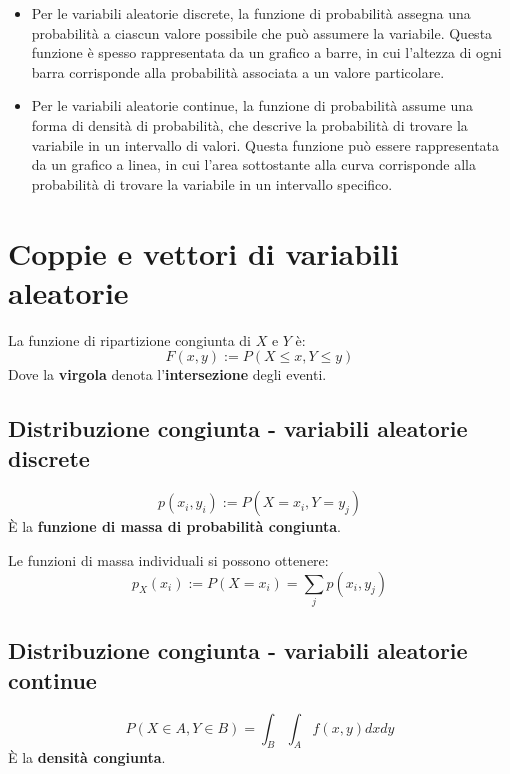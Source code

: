 \begin{itemize}
  \item Per le variabili aleatorie discrete, la funzione di probabilità assegna una probabilità a ciascun valore possibile che può assumere la variabile. Questa funzione è spesso rappresentata da un grafico a barre, in cui l'altezza di ogni barra corrisponde alla probabilità associata a un valore particolare.

  \item Per le variabili aleatorie continue, la funzione di probabilità assume una forma di densità di probabilità, che descrive la probabilità di trovare la variabile in un intervallo di valori. Questa funzione può essere rappresentata da un grafico a linea, in cui l'area sottostante alla curva corrisponde alla probabilità di trovare la variabile in un intervallo specifico.
\end{itemize}

\section{Coppie e vettori di variabili aleatorie}

La funzione di ripartizione congiunta di $X$ e $Y$ è:
\begin{equation}
  F(x, y) := P(X \leq x, Y \leq y)
\end{equation}
Dove la \textbf{virgola} denota l'\textbf{intersezione} degli eventi.

\subsection{Distribuzione congiunta - variabili aleatorie discrete}
\begin{equation}
  p(x_i, y_i) := P(X = x_i, Y = y_j)
\end{equation}
È la \textbf{funzione di massa di probabilità congiunta}.

Le funzioni di massa individuali si possono ottenere:
\begin{equation}
  p_X(x_i) := P(X =x_i) = \sum_j p(x_i, y_j)
\end{equation}

\subsection{Distribuzione congiunta - variabili aleatorie continue}
\begin{equation}
  P(X \in A, Y \in B) = \int_B\int_A f(x, y) dxdy
\end{equation}
È la \textbf{densità congiunta}.

